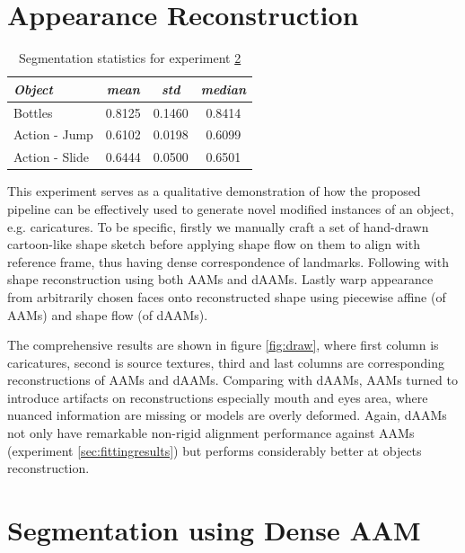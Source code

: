 \section{Appearance Reconstruction}
\label{sec:reconstruct}

\begin{table}[!b]
\small
\centering
\begin{tabular}{|l|c|c|c|}
\hline
\emph{Object}   & \emph{mean} & \emph{std} & \emph{median}\\
\hline\hline
Bottles         & 0.8125      & 0.1460     & 0.8414\\
Action - Jump   & 0.6102      & 0.0198     & 0.6099\\
Action - Slide  & 0.6444      & 0.0500     & 0.6501\\
\hline
\end{tabular}
\caption{Segmentation statistics for experiment \ref{sec:segmentation}}
\label{tab:seg_result}
\end{table}

This experiment serves as a qualitative demonstration of how the proposed pipeline can be effectively used to generate novel modified instances of an object, e.g. caricatures. To be specific, firstly we manually craft a set of hand-drawn cartoon-like shape sketch before applying shape flow on them to align with reference frame, thus having dense correspondence of landmarks. Following with shape reconstruction using both AAMs and dAAMs. Lastly warp appearance from arbitrarily chosen faces onto reconstructed shape using piecewise affine (of AAMs) and shape flow (of dAAMs). 

The comprehensive results are shown in figure \ref{fig:draw}, where first column is caricatures, second is source textures, third and last columns are corresponding reconstructions of AAMs and dAAMs. Comparing with dAAMs, AAMs turned to introduce artifacts on reconstructions especially mouth and eyes area, where nuanced information are missing or models are overly deformed. Again, dAAMs not only have remarkable non-rigid alignment performance against AAMs (experiment \ref{sec:fittingresults}) but performs considerably better at objects reconstruction.

\section{Segmentation using Dense AAM}
\label{sec:segmentation}

